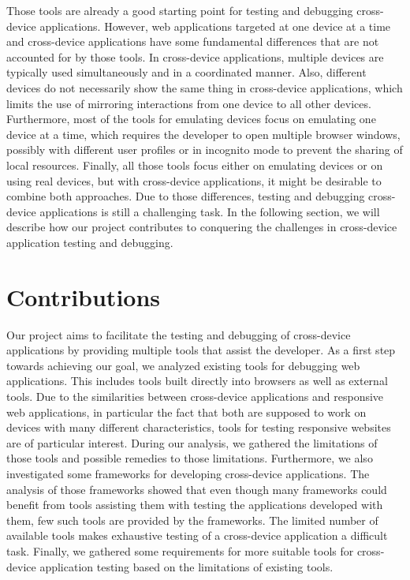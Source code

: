Those tools are already a good starting point for testing and debugging cross-device applications. However, web applications targeted at one device at a time and cross-device applications have some fundamental differences that are not accounted for by those tools. In cross-device applications, multiple devices are typically used simultaneously and in a coordinated manner. Also, different devices do not necessarily show the same thing in cross-device applications, which limits the use of mirroring interactions from one device to all other devices. Furthermore, most of the tools for emulating devices focus on emulating one device at a time, which requires the developer to open multiple browser windows, possibly with different user profiles or in incognito mode to prevent the sharing of local resources. Finally, all those tools focus either on emulating devices or on using real devices, but with cross-device applications, it might be desirable to combine both approaches. Due to those differences, testing and debugging cross-device applications is still a challenging task. In the following section, we will describe how our project contributes to conquering the challenges in cross-device application testing and debugging.

\section{Contributions}

Our project aims to facilitate the testing and debugging of cross-device applications by providing multiple tools that assist the developer. As a first step towards achieving our goal, we analyzed existing tools for debugging web applications. This includes tools built directly into browsers as well as external tools. Due to the similarities between cross-device applications and responsive web applications, in particular the fact that both are supposed to work on devices with many different characteristics, tools for testing responsive websites are of particular interest. During our analysis, we gathered the limitations of those tools and possible remedies to those limitations. Furthermore, we also investigated some frameworks for developing cross-device applications. The analysis of those frameworks showed that even though many frameworks could benefit from tools assisting them with testing the applications developed with them, few such tools are provided by the frameworks. The limited number of available tools makes exhaustive testing of a cross-device application a difficult task. Finally, we gathered some requirements for more suitable tools for cross-device application testing based on the limitations of existing tools.


